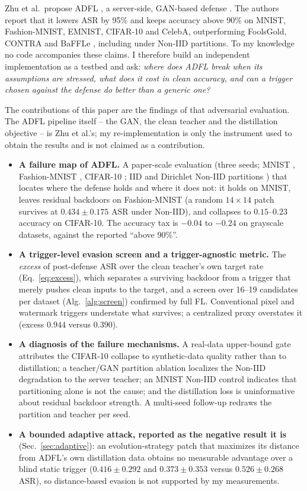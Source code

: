 \documentclass[conference]{IEEEtran}
\begin{document}
Zhu et al.\ propose ADFL \cite{zhu2023adfl}, a server-side, GAN-based defense \cite{goodfellow2014gan}. The authors report that it lowers ASR by 95\% and keeps accuracy above 90\% on MNIST, Fashion-MNIST, EMNIST, CIFAR-10 and CelebA, outperforming FoolsGold, CONTRA and BaFFLe \cite{fung2020foolsgold,awan2021contra,andreina2021baffle}, including under Non-IID partitions. To my knowledge no code accompanies these claims. I therefore build an independent implementation as a testbed and ask: \emph{where does ADFL break when its assumptions are stressed, what does it cost in clean accuracy, and can a trigger chosen against the defense do better than a generic one?}

The contributions of this paper are the findings of that adversarial evaluation. The ADFL pipeline itself -- the GAN, the clean teacher and the distillation objective -- is Zhu et al.'s; my re-implementation is only the instrument used to obtain the results and is not claimed as a contribution.
\begin{itemize}
\item \textbf{A failure map of ADFL.} A paper-scale evaluation (three seeds; MNIST \cite{lecun1998mnist}, Fashion-MNIST \cite{xiao2017fashion}, CIFAR-10 \cite{krizhevsky2009cifar}; IID and Dirichlet Non-IID partitions \cite{hsu2019noniid}) that locates where the defense holds and where it does not: it holds on MNIST, leaves residual backdoors on Fashion-MNIST (a random $14{\times}14$ patch survives at $0.434\pm0.175$ ASR under Non-IID), and collapses to $0.15$--$0.23$ accuracy on CIFAR-10. The accuracy tax is $-0.04$ to $-0.24$ on grayscale datasets, against the reported ``above 90\%''.
\item \textbf{A trigger-level evasion screen and a trigger-agnostic metric.} The \emph{excess} of post-defense ASR over the clean teacher's own target rate (Eq.~\ref{eq:excess}), which separates a surviving backdoor from a trigger that merely pushes clean inputs to the target, and a screen over 16--19 candidates per dataset (Alg.~\ref{alg:screen}) confirmed by full FL. Conventional pixel and watermark triggers understate what survives; a centralized proxy overstates it (excess $0.944$ versus $0.390$).
\item \textbf{A diagnosis of the failure mechanisms.} A real-data upper-bound gate attributes the CIFAR-10 collapse to synthetic-data quality rather than to distillation; a teacher/GAN partition ablation localizes the Non-IID degradation to the server teacher; an MNIST Non-IID control indicates that partitioning alone is not the cause; and the distillation loss is uninformative about residual backdoor strength. A multi-seed follow-up redraws the partition and teacher per seed.
\item \textbf{A bounded adaptive attack, reported as the negative result it is} (Sec.~\ref{sec:adaptive}): an evolution-strategy patch that maximizes its distance from ADFL's own distillation data obtains no measurable advantage over a blind static trigger ($0.416\pm0.292$ and $0.373\pm0.353$ versus $0.526\pm0.268$ ASR), so distance-based evasion is not supported by my measurements.
\end{itemize}
\end{document}
